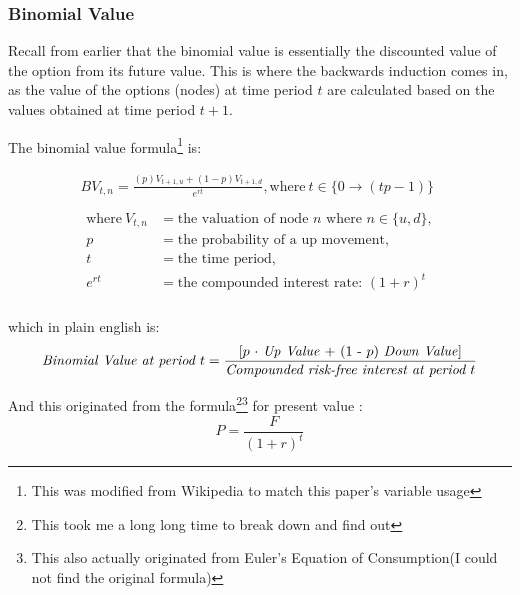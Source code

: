 \documentclass[12pt, letterpaper]{article}\usepackage{float}
\begin{document}
\subsubsection*{Binomial Value}
Recall from earlier that the binomial value is essentially the discounted value of the option from its future value.
This is where the backwards induction comes in, as the value of the options (nodes) at time period ${t}$ are calculated based on the values obtained at time period ${t+1}$.

\bigskip

The binomial value formula\footnote{This was modified from Wikipedia to match this paper's variable usage} is:

\begin{gather*}
  BV_{t, n} = \frac{(p)V_{t+1,u} + (1-p)V_{t+1,d}}{e^{rt}}, \text{where}~t \in \{0 \rightarrow (tp-1) \} \\
  \\
  \begin{align*}
    \text{where}~V_{t,n} &= \text{the valuation of node ${n}$ where ${n \in \{u, d\}}$}, \\
    p &= \text{the probability of a up movement}, \\
    t &= \text{the time period}, \\
    e^{rt} &= \text{the compounded interest rate: } (1 + r)^t
  \end{align*} \\
\end{gather*}

\pagebreak

\noindent which in plain english is:
\begin{equation*}
  \text{\textit{Binomial Value at period ${t}$}} = \frac{\text{[${p}$ ${\cdot}$ \textit{Up Value} + (1 - ${p}$) \textit{Down Value}]}}{\text{\textit{Compounded risk-free interest at period ${t}$}}}
\end{equation*}

\bigskip

And this originated from the formula\footnote{This took me a long long time to break down and find out}\footnote{This also actually originated from Euler's Equation of Consumption\cite{riskneutralmeasurestackexchange}(I could not find the original formula) } for present value \cite{presentvaluewikipedia}:
\begin{equation*}
  P = \frac{F}{(1+r)^t}
\end{equation*}
\end{document}
